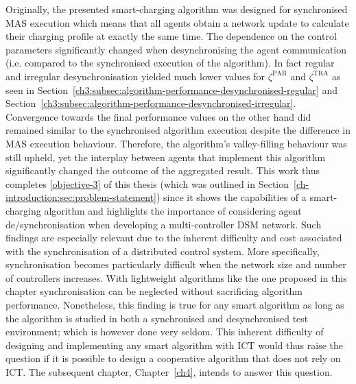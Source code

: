 Originally, the presented smart-charging algorithm was designed for synchronised MAS execution which means that all agents obtain a network update to calculate their charging profile at exactly the same time.
The dependence on the control parameters significantly changed when desynchronising the agent communication (i.e. compared to the synchronised execution of the algorithm).
In fact regular and irregular desynchronisation yielded much lower values for $\zeta^\text{PAR}$ and $\zeta^\text{TRA}$ as seen in Section~\ref{ch3:subsec:algorithm-performance-desynchronised-regular} and Section~\ref{ch3:subsec:algorithm-performance-desynchronised-irregular}.
Convergence towards the final performance values on the other hand did remained similar to the synchronised algorithm execution despite the difference in MAS execution behaviour.
Therefore, the algorithm's valley-filling behaviour was still upheld, yet the interplay between agents that implement this algorithm significantly changed the outcome of the aggregated result.
This work thus completes \ref{objective-3} of this thesis (which was outlined in Section~\ref{ch-introduction:sec:problem-statement}) since it shows the capabilities of a smart-charging algorithm and highlights the importance of considering agent de/synchronisation when developing a multi-controller DSM network.
Such findings are especially relevant due to the inherent difficulty and cost associated with the synchronisation of a distributed control system.
More specifically, synchronisation becomes particularly difficult when the network size and number of controllers increases.
With lightweight algorithms like the one proposed in this chapter synchronisation can be neglected without sacrificing algorithm performance.
Nonetheless, this finding is true for any smart algorithm as long as the algorithm is studied in both a synchronised and desynchronised test environment; which is however done very seldom.
This inherent difficulty of designing and implementing any smart algorithm with ICT would thus raise the question if it is possible to design a cooperative algorithm that does not rely on ICT.
The subsequent chapter, Chapter~\ref{ch4}, intends to answer this question.






